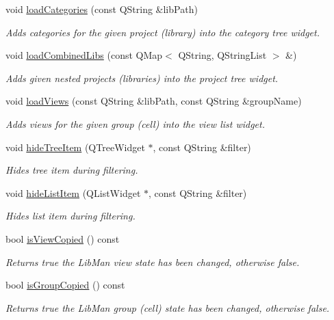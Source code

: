 \begin{DoxyCompactItemize}
void \hyperlink{classMainWindow_a75030b8780aaa7a2a1f44af3ae72feed}{load\-Categories} (const Q\-String \&lib\-Path)
\begin{DoxyCompactList}\small\item\em Adds categories for the given project (library) into the category tree widget. \end{DoxyCompactList}\item 
void \hyperlink{classMainWindow_a5ebd5eb51726eb69e0e0243750c926a9}{load\-Combined\-Libs} (const Q\-Map$<$ Q\-String, Q\-String\-List $>$ \&)
\begin{DoxyCompactList}\small\item\em Adds given nested projects (libraries) into the project tree widget. \end{DoxyCompactList}\item 
void \hyperlink{classMainWindow_a4124c5b7d11a382c1d131b93787d397a}{load\-Views} (const Q\-String \&lib\-Path, const Q\-String \&group\-Name)
\begin{DoxyCompactList}\small\item\em Adds views for the given group (cell) into the view list widget. \end{DoxyCompactList}\item 
void \hyperlink{classMainWindow_a4d19d583bbd0cdfe6db28d7253e98c69}{hide\-Tree\-Item} (Q\-Tree\-Widget $\ast$, const Q\-String \&filter)
\begin{DoxyCompactList}\small\item\em Hides tree item during filtering. \end{DoxyCompactList}\item 
void \hyperlink{classMainWindow_afd7b30dc6f95760354af27809bc86a53}{hide\-List\-Item} (Q\-List\-Widget $\ast$, const Q\-String \&filter)
\begin{DoxyCompactList}\small\item\em Hides list item during filtering. \end{DoxyCompactList}\item 
bool \hyperlink{classMainWindow_a477c0c286505480fa0ecab597cc928aa}{is\-View\-Copied} () const 
\begin{DoxyCompactList}\small\item\em Returns true the Lib\-Man view state has been changed, otherwise false. \end{DoxyCompactList}\item 
bool \hyperlink{classMainWindow_a2b97dc2343a874c73c6c8453c89a98ae}{is\-Group\-Copied} () const 
\begin{DoxyCompactList}\small\item\em Returns true the Lib\-Man group (cell) state has been changed, otherwise false. \end{DoxyCompactList}\item 

\end{DoxyCompactItemize}
